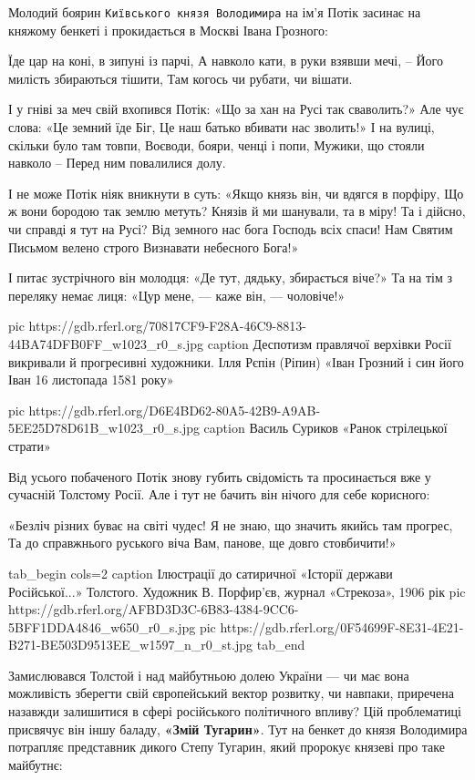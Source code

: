 Молодий боярин \verb|Київського князя Володимира| на ім’я Потік засинає на княжому
бенкеті і прокидається в Москві Івана Грозного:

\begin{multicols}{2}
  \obeycr
Їде цар на коні, в зипуні із парчі,
А навколо кати, в руки взявши мечі, –
Його милість збираються тішити,
Там когось чи рубати, чи вішати.

І у гніві за меч свій вхопився Потік:
«Що за хан на Русі так сваволить?»
Але чує слова: «Це земний їде Біг,
Це наш батько вбивати нас зволить!»
І на вулиці, скільки було там товпи,
Воєводи, бояри, ченці і попи,
Мужики, що стояли навколо –
Перед ним повалилися долу.

І не може Потік ніяк вникнути в суть:
«Якщо князь він, чи вдягся в порфіру,
Що ж вони бородою так землю метуть?
Князів й ми шанували, та в міру!
Та і дійсно, чи справді я тут на Русі?
Від земного нас бога Господь всіх спаси!
Нам Святим Письмом велено строго
Визнавати небесного Бога!»

І питає зустрічного він молодця:
«Де тут, дядьку, збирається віче?»
Та на тім з переляку немає лиця:
«Цур мене, --- каже він, --- чоловіче!»
  \restorecr
\end{multicols}

\ifcmt
pic https://gdb.rferl.org/70817CF9-F28A-46C9-8813-44BA74DFB0FF_w1023_r0_s.jpg
caption Деспотизм правлячої верхівки Росії викривали й прогресивні художники. Ілля Рєпін (Ріпин) «Іван Грозний і син його Іван 16 листопада 1581 року»
\fi

\ifcmt
pic https://gdb.rferl.org/D6E4BD62-80A5-42B9-A9AB-5EE25D78D61B_w1023_r0_s.jpg
caption Василь Суриков «Ранок стрілецької страти» 
\fi

Від усього побаченого Потік знову губить свідомість та просинається вже у
сучасній Толстому Росії. Але і тут не бачить він нічого для себе корисного:

\obeycr
«Безліч різних буває на світі чудес!
Я не знаю, що значить якийсь там прогрес,
Та до справжнього руського віча
Вам, панове, ще довго стовбичити!»
\restorecr

\ifcmt
tab_begin cols=2
  caption Ілюстрації до сатиричної «Історії держави Російської...» Толстого. Художник В. Порфир’єв, журнал «Стрекоза», 1906 рік
  pic https://gdb.rferl.org/AFBD3D3C-6B83-4384-9CC6-5BFF1DDA4846_w650_r0_s.jpg
  pic https://gdb.rferl.org/0F54699F-8E31-4E21-B271-BE503D9513EE_w1597_n_r0_st.jpg
tab_end
\fi

Замислювався Толстой і над майбутньою долею України --- чи має вона можливість
зберегти свій європейський вектор розвитку, чи навпаки, приречена назавжди
залишитися в сфері російського політичного впливу? Цій проблематиці присвячує
він іншу баладу, \textbf{«Змій Тугарин»}. Тут на бенкет до князя Володимира
потрапляє представник дикого Степу Тугарин, який пророкує князеві про таке
майбутнє:

